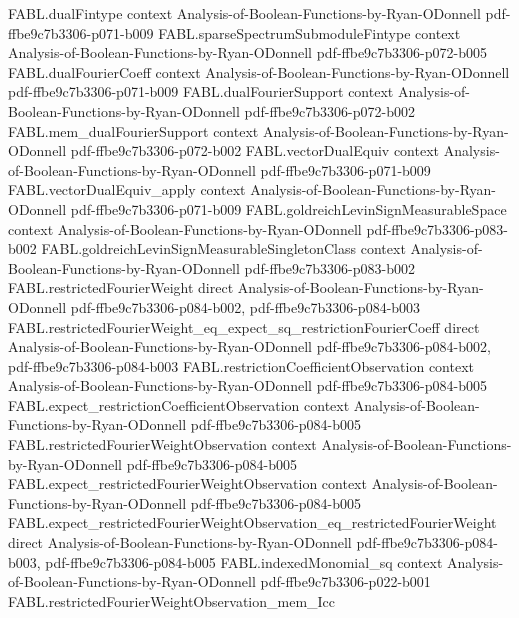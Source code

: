 \begin{theorem}
\proofstep
  {FABL.dualFintype}
  {context}
  {Analysis-of-Boolean-Functions-by-Ryan-ODonnell}
  {pdf-ffbe9c7b3306-p071-b009}
\proofstep
  {FABL.sparseSpectrumSubmoduleFintype}
  {context}
  {Analysis-of-Boolean-Functions-by-Ryan-ODonnell}
  {pdf-ffbe9c7b3306-p072-b005}
\proofstep
  {FABL.dualFourierCoeff}
  {context}
  {Analysis-of-Boolean-Functions-by-Ryan-ODonnell}
  {pdf-ffbe9c7b3306-p071-b009}
\proofstep
  {FABL.dualFourierSupport}
  {context}
  {Analysis-of-Boolean-Functions-by-Ryan-ODonnell}
  {pdf-ffbe9c7b3306-p072-b002}
\proofstep
  {FABL.mem_dualFourierSupport}
  {context}
  {Analysis-of-Boolean-Functions-by-Ryan-ODonnell}
  {pdf-ffbe9c7b3306-p072-b002}
\proofstep
  {FABL.vectorDualEquiv}
  {context}
  {Analysis-of-Boolean-Functions-by-Ryan-ODonnell}
  {pdf-ffbe9c7b3306-p071-b009}
\proofstep
  {FABL.vectorDualEquiv_apply}
  {context}
  {Analysis-of-Boolean-Functions-by-Ryan-ODonnell}
  {pdf-ffbe9c7b3306-p071-b009}
\proofstep
  {FABL.goldreichLevinSignMeasurableSpace}
  {context}
  {Analysis-of-Boolean-Functions-by-Ryan-ODonnell}
  {pdf-ffbe9c7b3306-p083-b002}
\proofstep
  {FABL.goldreichLevinSignMeasurableSingletonClass}
  {context}
  {Analysis-of-Boolean-Functions-by-Ryan-ODonnell}
  {pdf-ffbe9c7b3306-p083-b002}
\proofstep
  {FABL.restrictedFourierWeight}
  {direct}
  {Analysis-of-Boolean-Functions-by-Ryan-ODonnell}
  {pdf-ffbe9c7b3306-p084-b002,
    pdf-ffbe9c7b3306-p084-b003}
\proofstep
  {FABL.restrictedFourierWeight_eq_expect_sq_restrictionFourierCoeff}
  {direct}
  {Analysis-of-Boolean-Functions-by-Ryan-ODonnell}
  {pdf-ffbe9c7b3306-p084-b002,
    pdf-ffbe9c7b3306-p084-b003}
\proofstep
  {FABL.restrictionCoefficientObservation}
  {context}
  {Analysis-of-Boolean-Functions-by-Ryan-ODonnell}
  {pdf-ffbe9c7b3306-p084-b005}
\proofstep
  {FABL.expect_restrictionCoefficientObservation}
  {context}
  {Analysis-of-Boolean-Functions-by-Ryan-ODonnell}
  {pdf-ffbe9c7b3306-p084-b005}
\proofstep
  {FABL.restrictedFourierWeightObservation}
  {context}
  {Analysis-of-Boolean-Functions-by-Ryan-ODonnell}
  {pdf-ffbe9c7b3306-p084-b005}
\proofstep
  {FABL.expect_restrictedFourierWeightObservation}
  {context}
  {Analysis-of-Boolean-Functions-by-Ryan-ODonnell}
  {pdf-ffbe9c7b3306-p084-b005}
\proofstep
  {FABL.expect_restrictedFourierWeightObservation_eq_restrictedFourierWeight}
  {direct}
  {Analysis-of-Boolean-Functions-by-Ryan-ODonnell}
  {pdf-ffbe9c7b3306-p084-b003,
    pdf-ffbe9c7b3306-p084-b005}
\proofstep
  {FABL.indexedMonomial_sq}
  {context}
  {Analysis-of-Boolean-Functions-by-Ryan-ODonnell}
  {pdf-ffbe9c7b3306-p022-b001}
\proofstep
  {FABL.restrictedFourierWeightObservation_mem_Icc}

\end{theorem}
